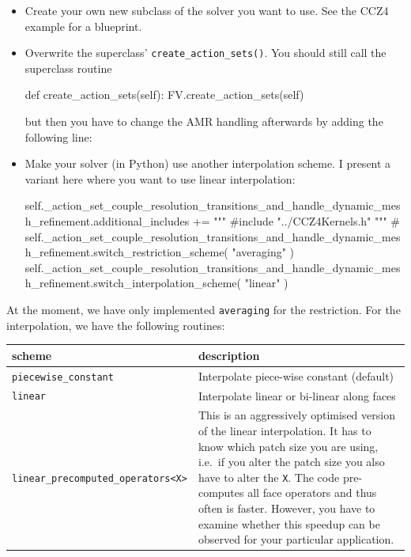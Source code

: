 \begin{itemize}
  \item Create your own new subclass of the solver you want to use. See the CCZ4 example for a blueprint.
  \item Overwrite the superclass' \texttt{create\_action\_sets()}. You should
  still call the superclass routine
  \begin{code}
def create_action_sets(self):
  FV.create_action_sets(self)
  
  \end{code}
  but then you have to change the AMR handling afterwards by adding the
  following line:
  \item Make your solver (in Python) use another interpolation scheme. I present
  a variant here where you want to use linear interpolation:
  \begin{code}
self._action_set_couple_resolution_transitions_and_handle_dynamic_mesh_refinement.additional_includes += """ 
  #include "../CCZ4Kernels.h"
"""
# self._action_set_couple_resolution_transitions_and_handle_dynamic_mesh_refinement.switch_restriction_scheme( "averaging" )
self._action_set_couple_resolution_transitions_and_handle_dynamic_mesh_refinement.switch_interpolation_scheme( "linear" )
  \end{code}
\end{itemize}

\noindent
At the moment, we have only implemented \texttt{averaging} for the restriction. 
For the interpolation, we have the following routines:

\begin{center}
 \begin{tabular}{l|p{8cm}}
  {\bf scheme} & description \\
  \hline
  \texttt{piecewise\_constant} & Interpolate piece-wise constant (default) \\
  \texttt{linear} & Interpolate linear or bi-linear along faces \\  
  \texttt{linear\_precomputed\_operators<X>} & This is an aggressively optimised version of the linear interpolation.
   It has to know which patch size you are using, i.e.~if you alter the patch size you also have to alter the \texttt{X}.
   The code pre-computes all face operators and thus often is faster. 
   However, you have to examine whether this speedup can be observed for your particular application. \\  
 \end{tabular}
\end{center}

